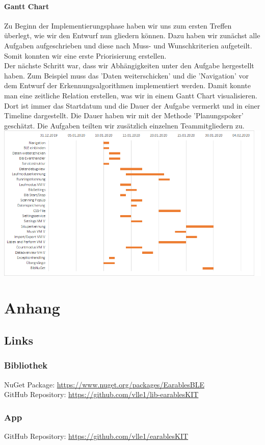 \documentclass[a4paper,12pt]{article}
\begin{document}
\paragraph{Gantt Chart}
Zu Beginn der Implementierungsphase haben wir uns zum ersten Treffen überlegt, wie wir den Entwurf nun gliedern können. Dazu haben wir zunächst alle Aufgaben aufgeschrieben und diese nach Muss- und Wunschkriterien aufgeteilt. Somit konnten wir eine erste Priorisierung erstellen.\\
 Der nächste Schritt war, dass wir Abhängigkeiten unter den Aufgabe hergestellt haben. Zum Beispiel muss das 'Daten weiterschicken' und die 'Navigation' vor dem Entwurf der Erkennungsalgorithmen implementiert werden. Damit konnte man eine zeitliche Relation erstellen, was wir in einem Gantt Chart visualisieren. Dort ist immer das Startdatum und die Dauer der Aufgabe vermerkt und in einer Timeline dargestellt.
Die Dauer haben wir mit der Methode 'Planungspoker' geschätzt. Die Aufgaben teilten wir zusätzlich einzelnen Teammitgliedern zu.
\newline
\newline
\includegraphics[width=\textwidth, height=0.5\textheight]{bilder/Implementierungsplan.png}

\section{Anhang}
\subsection{Links}
\subsubsection{Bibliothek}
NuGet Package: \url{https://www.nuget.org/packages/EarablesBLE}\\
GitHub Repository: \url{https://github.com/vlle1/lib-earablesKIT}
\subsubsection{App}
GitHub Repository: \url{https://github.com/vlle1/earablesKIT}


\printglossaries
{}
\end{document}
